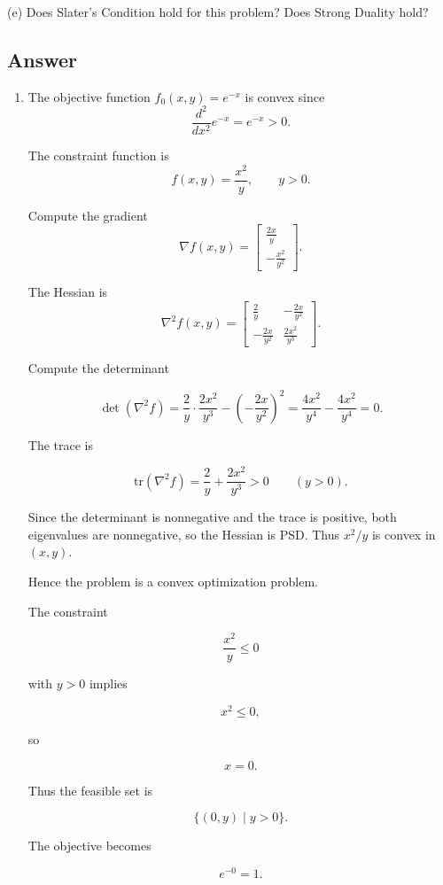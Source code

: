 \documentclass[
	12pt,
]{fphw}
\begin{document}
(e) Does Slater’s Condition hold for this problem?
Does Strong Duality hold?

\subsection*{Answer}

\begin{enumerate}

\item[(a)]

The objective function \(f_0(x,y)=e^{-x}\) is convex since
\[
\frac{d^2}{dx^2}e^{-x}=e^{-x}>0.
\]

The constraint function is
\[
f(x,y)=\frac{x^2}{y}, \qquad y>0.
\]

Compute the gradient
\[
\nabla f(x,y)=
\begin{bmatrix}
\frac{2x}{y}\\[4pt]
-\frac{x^2}{y^2}
\end{bmatrix}.
\]

The Hessian is
\[
\nabla^2 f(x,y)=
\begin{bmatrix}
\frac{2}{y} & -\frac{2x}{y^2}\\[6pt]
-\frac{2x}{y^2} & \frac{2x^2}{y^3}
\end{bmatrix}.
\]

Compute the determinant

\[
\det(\nabla^2 f)
=
\frac{2}{y}\cdot\frac{2x^2}{y^3}
-
\left(-\frac{2x}{y^2}\right)^2
=
\frac{4x^2}{y^4}-\frac{4x^2}{y^4}
=0.
\]

The trace is

\[
\text{tr}(\nabla^2 f)
=
\frac{2}{y}+\frac{2x^2}{y^3}>0
\qquad (y>0).
\]

Since the determinant is nonnegative and the trace is positive,
both eigenvalues are nonnegative, so the Hessian is PSD.
Thus \(x^2/y\) is convex in \((x,y)\).

Hence the problem is a convex optimization problem.

The constraint

\[
\frac{x^2}{y}\le0
\]

with \(y>0\) implies

\[
x^2\le0,
\]

so

\[
x=0.
\]

Thus the feasible set is

\[
\{(0,y)\mid y>0\}.
\]

The objective becomes

\[
e^{-0}=1.
\]


\end{enumerate}
\end{document}
